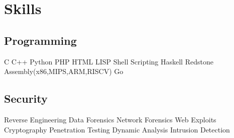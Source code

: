 \documentclass[]{illustris-resume-openfont}
\begin{document}
\begin{minipage}[t]{0.33\textwidth}
\section{Skills}
\subsection{Programming}
C \textbullet{} C++ \textbullet{} Python \textbullet{} PHP \textbullet{} HTML \textbullet{} LISP \textbullet{} Shell Scripting \textbullet{} Haskell \textbullet{} Redstone \textbullet{} Assembly(x86,MIPS,ARM,RISCV) \textbullet{} Go
\sectionsep

\subsection{Security}
Reverse Engineering \textbullet{} Data Forensics \textbullet{} Network Forensics \textbullet{} Web Exploits \textbullet{} Cryptography \textbullet{} Penetration Testing \textbullet{} Dynamic Analysis \textbullet{} Intrusion Detection
\sectionsep

%
%

\end{minipage} 
\hfill
\end{document}
